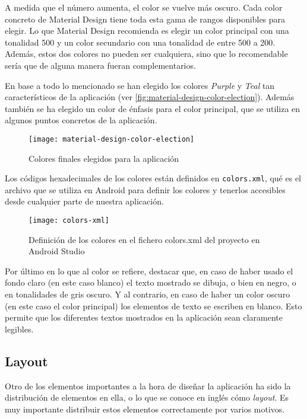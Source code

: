 A medida que el número aumenta, el color se vuelve más oscuro. Cada color concreto de Material Design tiene toda esta gama de rangos disponibles para elegir. Lo que Material Design recomienda es elegir un color principal con una tonalidad 500 y un color secundario con una tonalidad de entre 500 a 200. Además, estos dos colores no pueden ser cualquiera, sino que lo recomendable sería que de alguna manera fueran complementarios.

En base a todo lo mencionado se han elegido los colores \textit{Purple} y \textit{Teal} tan característicos de la aplicación (ver \autoref{fig:material-design-color-election}). Además también se ha elegido un color de énfasis para el color principal, que se utiliza en algunos puntos concretos de la aplicación.

\begin{figure}[H]
	\centering
	\texttt{[image: material-design-color-election]}
	\caption{Colores finales elegidos para la aplicación}
	\label{fig:material-design-color-election}
\end{figure}

Los códigos hexadecimales de los colores están definidos en \texttt{colors.xml}, qué es el archivo que se utiliza en Android para definir los colores y tenerlos accesibles desde cualquier parte de nuestra aplicación.

\begin{figure}[H]
	\centering
	\texttt{[image: colors-xml]}
	\caption{Definición de los colores en el fichero colors.xml del proyecto en Android Studio}
	\label{fig:colors-xml}
\end{figure}

Por último en lo que al color se refiere, destacar que, en caso de haber usado el fondo claro (en este caso blanco) el texto mostrado se dibuja, o bien en negro, o en tonalidades de gris oscuro. Y al contrario, en caso de haber un color oscuro (en este caso el color principal) los elementos de texto se escriben en blanco. Esto permite que los diferentes textos mostrados en la aplicación sean claramente legibles.

\subsection{Layout}

Otro de los elementos importantes a la hora de diseñar la aplicación ha sido la distribución de elementos en ella, o lo que se conoce en inglés cómo \textit{layout}. Es muy importante distribuir estos elementos correctamente por varios motivos.

